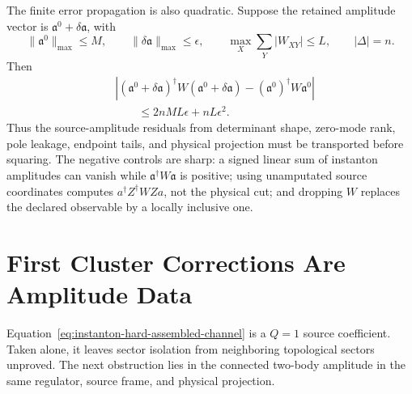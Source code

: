 \begin{controlledapproximation}
The finite error propagation is also quadratic.  Suppose the retained
amplitude vector is \(\mathfrak a^0+\delta\mathfrak a\), with
\[
  \|\mathfrak a^0\|_{\max}\le M,\qquad
  \|\delta\mathfrak a\|_{\max}\le\epsilon,\qquad
  \max_X\sum_Y |W_{XY}|\le L,\qquad |\Delta|=n .
\]
Then
\begin{equation}
\begin{aligned}
  &\left|
  (\mathfrak a^0+\delta\mathfrak a)^\dagger
  W
  (\mathfrak a^0+\delta\mathfrak a)
  -
  (\mathfrak a^0)^\dagger W\mathfrak a^0
  \right|                                      \\
  &\qquad\le
  2nML\epsilon+nL\epsilon^2 .
\end{aligned}
  \label{eq:instanton-inclusive-quadratic-error-bound}
\end{equation}
Thus the source-amplitude residuals from determinant shape, zero-mode rank,
pole leakage, endpoint tails, and physical projection must be transported
before squaring.  The negative controls are sharp: a signed linear sum of
instanton amplitudes can vanish while
\(\mathfrak a^\dagger W\mathfrak a\) is positive; using unamputated source
coordinates computes \(a^\dagger Z^\dagger WZa\), not the physical cut; and
dropping \(W\) replaces the declared observable by a locally inclusive one.
\end{controlledapproximation}

\section{First Cluster Corrections Are Amplitude Data}
\label{sec:instanton-first-cluster-amplitude-correction}

Equation~\eqref{eq:instanton-hard-assembled-channel} is a \(Q=1\) source
coefficient.  Taken alone, it leaves sector isolation from neighboring
topological sectors unproved.  The next obstruction lies in the connected
two-body amplitude in the same regulator, source frame, and physical
projection.

